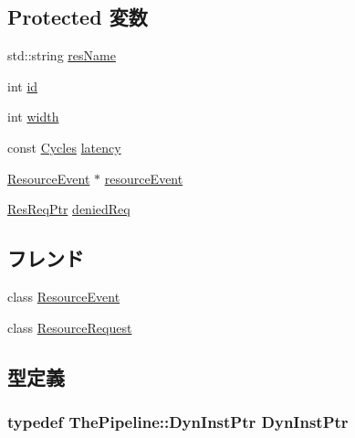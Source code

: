 \subsection*{Protected 変数}
\begin{DoxyCompactItemize}
\item 
std::string \hyperlink{classResource_a991d4c92f58169fd45fe3f1c1881ac9e}{resName}
\item 
int \hyperlink{classResource_a7441ef0865bcb3db9b8064dd7375c1ea}{id}
\item 
int \hyperlink{classResource_a2474a5474cbff19523a51eb1de01cda4}{width}
\item 
const \hyperlink{classCycles}{Cycles} \hyperlink{classResource_a46b9d67ee437c6ecdbedca8ec8d2ed40}{latency}
\item 
\hyperlink{classResourceEvent}{ResourceEvent} $\ast$ \hyperlink{classResource_abde7a6c4ff046aa4c2ecd476c4266be3}{resourceEvent}
\item 
\hyperlink{classResourceRequest}{ResReqPtr} \hyperlink{classResource_a52489b62c55d7db3b70c3713b3000601}{deniedReq}
\end{DoxyCompactItemize}
\subsection*{フレンド}
\begin{DoxyCompactItemize}
\item 
class \hyperlink{classResource_a80da161b04f097f36d40b2bb699192b6}{ResourceEvent}
\item 
class \hyperlink{classResource_ae78e4599e7afd86b067119e90ac5dfed}{ResourceRequest}
\end{DoxyCompactItemize}


\subsection{型定義}
\hypertarget{classResource_af9d0c8a46736ba6aa2d8bb94da1a5e73}{
\subsubsection[{DynInstPtr}]{\setlength{\rightskip}{0pt plus 5cm}typedef {\bf ThePipeline::DynInstPtr} {\bf DynInstPtr}}}
\label{classResource_af9d0c8a46736ba6aa2d8bb94da1a5e73}


